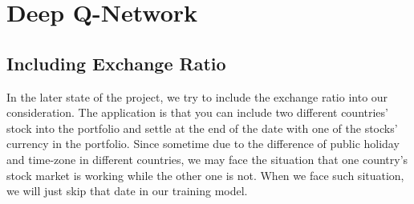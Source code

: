\section{Deep Q-Network}

\subsection{Including Exchange Ratio}
In the later state of the project, we try to include the exchange ratio into our consideration. The application is that you can include two different countries' stock into the portfolio and settle at the end of the date with one of the stocks' currency in the portfolio. Since sometime due to the difference of public holiday and time-zone in different countries, we may face the situation that one country's stock market is working while the other one is not. When we face such situation, we will just skip that date in our training model.

\endinput
